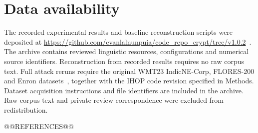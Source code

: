\documentclass[12pt]{article}
\begin{document}
\section*{Data availability}
The recorded experimental results and baseline reconstruction scripts were deposited at \url{https://github.com/cvanlalnunpuia/code_repo_crypt/tree/v1.0.2}~\cite{studydata}. The archive contains reviewed linguistic resources, configurations and numerical source identifiers. Reconstruction from recorded results requires no raw corpus text. Full attack reruns require the original WMT23 IndicNE-Corp, FLORES-200 and Enron datasets~\cite{indic,flores,enrondata}, together with the IHOP code revision specified in Methods. Dataset acquisition instructions and file identifiers are included in the archive. Raw corpus text and private review correspondence were excluded from redistribution.

@@REFERENCES@@
\end{document}
